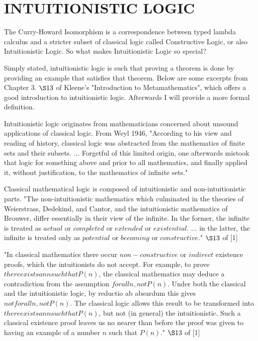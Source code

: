 %
%
\chapter{INTUITIONISTIC LOGIC}\label{ch:logic}
The Curry-Howard Isomorphism is a correspondence between typed lambda calculus and a stricter subset of classical logic called Constructive Logic, or also Intuitionistic Logic. So what makes Intuitionistic Logic so special?

Simply stated, intuitionistic logic is such that proving a theorem is done by providing an example that satisfies that theorem. Below are some excerpts from Chapter 3. $\S 13$ of Kleene's "Introduction to Metamathematics", which offers a good introduction to intuitionistic logic. Afterwards I will provide a more formal definition.

Intuitionistic logic originates from mathematicians concerned about unsound applications of classical logic. From Weyl 1946, "According to his view and reading of history, classical logic was abstracted from the mathematics of finite sets and their subsets. ... Forgetful of this limited origin, one afterwards mistook that logic for something above and prior to all mathematics, and finally applied it, without justification, to the mathematics of infinite sets."

Classical mathematical logic is composed of intuitionistic and non-intuitionistic parts. "The non-intuitionistic mathematics which culminated in the theories of Weierstrass, Dedekind, and Cantor, and the intuitionistic mathematics of Brouwer, differ essentially in their view of the infinite. In the former, the infinite is treated as $actual$ or $completed$ or $extended$ or $existential$. ... in the latter, the infinite is treated only as $potential$ or $becoming$ or $constructive$." $\S 13$ of [1]

"In classical mathematics there occur $non-constructive$ or $indirect$ existence proofs, which the intuitionists do not accept. For example, to prove $there exists an n such that P(n)$, the classical mathematics may deduce a contradiction from the assumption $for all n, not P(n)$. Under both the classical and the intuitionistic logic, by reductio ab absurdum this gives $not for all n, not P(n)$. The classical logic allows this result to be transformed into $there exists an n such that P(n)$, but not (in general) the intuitionistic. Such a classical existence proof leaves us no nearer than before the proof was given to having an example of a number $n$ such that $P(n)$." $\S 13$ of [1]


